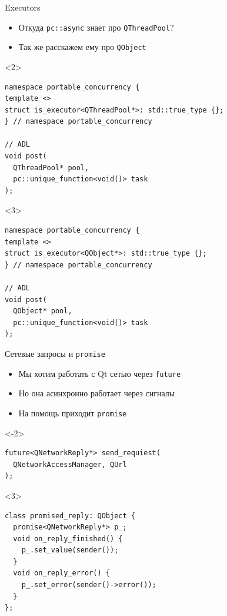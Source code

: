 \documentclass[aspectratio=169,pdf,hyperref={unicode},14pt]{beamer}
\begin{document}
\begin{frame}[fragile,t]{Executors}
 \begin{itemize}
  \item<1-> Откуда \texttt{pc::async} знает про \texttt{QThreadPool}?
  \item<3> Так же расскажем ему про \texttt{QObject}
 \end{itemize}
 \begin{onlyenv}<2>
  \begin{lstlisting}[style=cppcode]
namespace portable_concurrency {
template <>
struct is_executor<QThreadPool*>: std::true_type {};
} // namespace portable_concurrency

// ADL
void post(
  QThreadPool* pool,
  pc::unique_function<void()> task
);
  \end{lstlisting}
 \end{onlyenv}
 \begin{onlyenv}<3>
  \begin{lstlisting}[style=cppcode]
namespace portable_concurrency {
template <>
struct is_executor<QObject*>: std::true_type {};
} // namespace portable_concurrency

// ADL
void post(
  QObject* pool,
  pc::unique_function<void()> task
);
  \end{lstlisting}
 \end{onlyenv}
\end{frame}

\begin{frame}[fragile,t]{Сетевые запросы и \texttt{promise}}
 \begin{itemize}[<+->]
  \item Мы хотим работать с Qt сетью через \texttt{future}
  \item Но она асинхронно работает через сигналы
  \item На помощь приходит \texttt{promise}
 \end{itemize}
 \begin{onlyenv}<-2>
 \begin{lstlisting}[style=cppcode]
future<QNetworkReply*> send_requiest(
  QNetworkAccessManager, QUrl
);
 \end{lstlisting}
 \end{onlyenv}
 \begin{onlyenv}<3>
  \begin{lstlisting}[style=cppcode]
class promised_reply: QObject {
  promise<QNetworkReply*> p_;
  void on_reply_finished() {
    p_.set_value(sender());
  }
  void on_reply_error() {
    p_.set_error(sender()->error());
  }
};
  \end{lstlisting}
 \end{onlyenv}
\end{frame}
\end{document}
